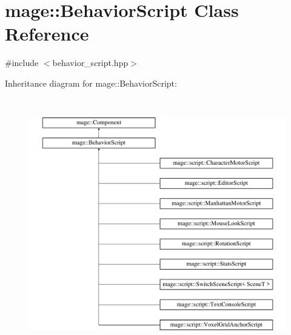 \hypertarget{classmage_1_1_behavior_script}{}\section{mage\+:\+:Behavior\+Script Class Reference}
\label{classmage_1_1_behavior_script}


{\ttfamily \#include $<$behavior\+\_\+script.\+hpp$>$}

Inheritance diagram for mage\+:\+:Behavior\+Script\+:\begin{figure}[H]
\begin{center}
\leavevmode
\includegraphics[height=11.000000cm]{classmage_1_1_behavior_script}
\end{center}
\end{figure}
